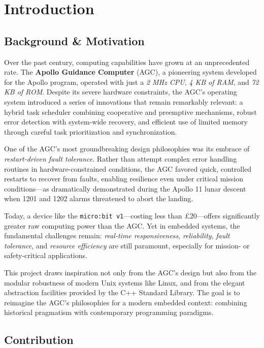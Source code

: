 \section{Introduction}

\subsection{Background \& Motivation}

Over the past century, computing capabilities have grown at an unprecedented rate. The
\textbf{Apollo Guidance Computer} (AGC), a pioneering system developed for the Apollo
program, operated with just a \textit{2 MHz CPU}, \textit{4 KB of RAM}, and \textit{72
KB of ROM}. Despite its severe hardware constraints, the AGC’s operating system
introduced a series of innovations that remain remarkably relevant: a hybrid task
scheduler combining cooperative and preemptive mechanisms, robust error detection with
system-wide recovery, and efficient use of limited memory through careful task
prioritization and synchronization.

One of the AGC's most groundbreaking design philosophies was its embrace of
\textit{restart-driven fault tolerance}. Rather than attempt complex error handling
routines in hardware-constrained conditions, the AGC favored quick, controlled restarts
to recover from faults, enabling resilience even under critical mission conditions—as
dramatically demonstrated during the Apollo 11 lunar descent when 1201 and 1202 alarms
threatened to abort the landing.

Today, a device like the \texttt{micro:bit v1}—costing less than \pounds20—offers
significantly greater raw computing power than the AGC. Yet in embedded systems, the
fundamental challenges remain: \textit{real-time responsiveness}, \textit{reliability},
\textit{fault tolerance}, and \textit{resource efficiency} are still paramount,
especially for mission- or safety-critical applications.

This project draws inspiration not only from the AGC's design but also from the modular
robustness of modern Unix systems like Linux, and from the elegant abstraction
facilities provided by the C++ Standard Library. The goal is to reimagine the AGC’s
philosophies for a modern embedded context: combining historical pragmatism with
contemporary programming paradigms.

\subsection{Contribution}

